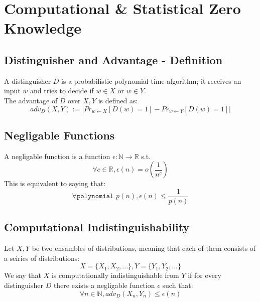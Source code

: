 \section*{Computational \& Statistical Zero Knowledge}
\subsection*{Distinguisher and Advantage - Definition}
A distinguisher $D$ is a probabilistic polynomial time algorithm;
it receives an input $w$ and tries to decide if $w\in X$ or $w\in Y$.\\
The advantage of $D$ over $X, Y$ is defined as:
\[
	adv_D(X,Y):=|Pr_{w\leftarrow X}[D(w)=1]-Pr_{w\leftarrow Y}[D(w)=1]|	
\]

\subsection*{Negligable Functions}
A negligable function is a function
$\epsilon:\mathbb{N}\rightarrow\mathbb{R}$ s.t.
\[\forall c\in\mathbb{R}, \epsilon(n)=o(\frac{1}{n^c})\]
This is equivalent to saying that:
\[\forall\texttt{polynomial }p(n), \epsilon(n)\leq \frac{1}{p(n)}\]

\subsection*{Computational Indistinguishability}
Let $X,Y$ be two ensambles of distributions, meaning
that each of them consists of a seiries of distributions:
\[
	X=\{X_1,X_2,...\}, Y=\{Y_1,Y_2,...\}
\]
We say that $X$ is computationally indistinguishable from $Y$ if
for every distinguisher $D$ there exists a negligable function $\epsilon$
such that:
\[
	\forall n\in\mathbb{N}, adv_D(X_n,Y_n)\leq \epsilon(n)
\]

